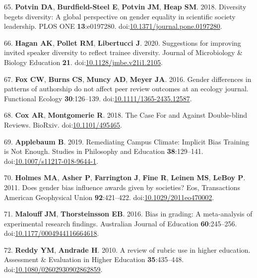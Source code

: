 \documentclass[11pt,]{article}
\begin{document}
\leavevmode\hypertarget{ref-potvin_diversity_2018}{}%
65. \textbf{Potvin DA}, \textbf{Burdfield-Steel E}, \textbf{Potvin JM},
\textbf{Heap SM}. 2018. Diversity begets diversity: A global perspective
on gender equality in scientific society leadership. PLOS ONE
\textbf{13}:e0197280.
doi:\href{https://doi.org/10.1371/journal.pone.0197280}{10.1371/journal.pone.0197280}.

\leavevmode\hypertarget{ref-Hagan2020}{}%
66. \textbf{Hagan AK}, \textbf{Pollet RM}, \textbf{Libertucci J}. 2020.
Suggestions for improving invited speaker diversity to reflect trainee
diversity. Journal of Microbiology \& Biology Education \textbf{21}.
doi:\href{https://doi.org/10.1128/jmbe.v21i1.2105}{10.1128/jmbe.v21i1.2105}.

\leavevmode\hypertarget{ref-fox_gender_2016}{}%
67. \textbf{Fox CW}, \textbf{Burns CS}, \textbf{Muncy AD}, \textbf{Meyer
JA}. 2016. Gender differences in patterns of authorship do not affect
peer review outcomes at an ecology journal. Functional Ecology
\textbf{30}:126--139.
doi:\href{https://doi.org/10.1111/1365-2435.12587}{10.1111/1365-2435.12587}.

\leavevmode\hypertarget{ref-cox_case_2018}{}%
68. \textbf{Cox AR}, \textbf{Montgomerie R}. 2018. The Case For and
Against Double-blind Reviews. BioRxiv.
doi:\href{https://doi.org/10.1101/495465}{10.1101/495465}.

\leavevmode\hypertarget{ref-applebaum_remediating_2019}{}%
69. \textbf{Applebaum B}. 2019. Remediating Campus Climate: Implicit
Bias Training is Not Enough. Studies in Philosophy and Education
\textbf{38}:129--141.
doi:\href{https://doi.org/10.1007/s11217-018-9644-1}{10.1007/s11217-018-9644-1}.

\leavevmode\hypertarget{ref-Holmes2011}{}%
70. \textbf{Holmes MA}, \textbf{Asher P}, \textbf{Farrington J},
\textbf{Fine R}, \textbf{Leinen MS}, \textbf{LeBoy P}. 2011. Does gender
bias influence awards given by societies? Eos, Transactions American
Geophysical Union \textbf{92}:421--422.
doi:\href{https://doi.org/10.1029/2011eo470002}{10.1029/2011eo470002}.

\leavevmode\hypertarget{ref-Malouff2016}{}%
71. \textbf{Malouff JM}, \textbf{Thorsteinsson EB}. 2016. Bias in
grading: A meta-analysis of experimental research findings. Australian
Journal of Education \textbf{60}:245--256.
doi:\href{https://doi.org/10.1177/0004944116664618}{10.1177/0004944116664618}.

\leavevmode\hypertarget{ref-Reddy2010}{}%
72. \textbf{Reddy YM}, \textbf{Andrade H}. 2010. A review of rubric use
in higher education. Assessment \& Evaluation in Higher Education
\textbf{35}:435--448.
doi:\href{https://doi.org/10.1080/02602930902862859}{10.1080/02602930902862859}.
\end{document}
